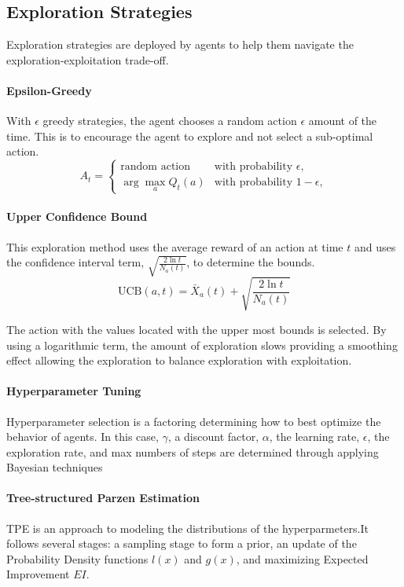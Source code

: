 \documentclass[conference]{IEEEtran}
\begin{document}
\subsection{Exploration Strategies}
Exploration strategies are deployed by agents to help them navigate the exploration-exploitation trade-off. 

\paragraph{Epsilon-Greedy}
With $\epsilon$ greedy strategies, the agent chooses a random action  $\epsilon$ amount of the time. This is to encourage the agent to explore and not select a sub-optimal action. 
\[
A_t = 
\begin{cases} 
\text{random action} & \text{with probability } \epsilon, \\
\arg\max_a Q_t(a) & \text{with probability } 1 - \epsilon,
\end{cases}
\]
\paragraph{Upper Confidence Bound}

This exploration method uses the average reward of an action at time $t$ and uses the confidence interval term,  $\sqrt{\frac{2 \ln t}{N_a(t)}}$, to determine the bounds. 
\[
\text{UCB}(a, t) = \bar{X}_a(t) + \sqrt{\frac{2 \ln t}{N_a(t)}}
\]

The action with the values located with the upper most bounds is selected. By using a logarithmic term, the amount of exploration slows providing a smoothing effect allowing the exploration to balance exploration with exploitation. 

\paragraph{Hyperparameter Tuning}
Hyperparameter selection is a factoring determining how to best optimize the behavior of agents. In this case, $\gamma$, a discount factor, $\alpha$, the learning rate, $\epsilon$, the exploration rate, and max numbers of steps are determined through applying Bayesian techniques 

\paragraph{ Tree-structured Parzen Estimation}
TPE is an approach to modeling the distributions of the hyperparmeters.It follows several stages: a sampling stage to form a prior, an update of the Probability Density functions $l(x)$ and $g(x)$, and maximizing Expected Improvement $EI$.
\end{document}
